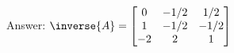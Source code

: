 Answer: $\inverse{A} = \begin{bmatrix} 0 & -1/2 & 1/2\\ 1 & -1/2 & -1/2 \\ -2 & 2 & 1
\end{bmatrix}$
